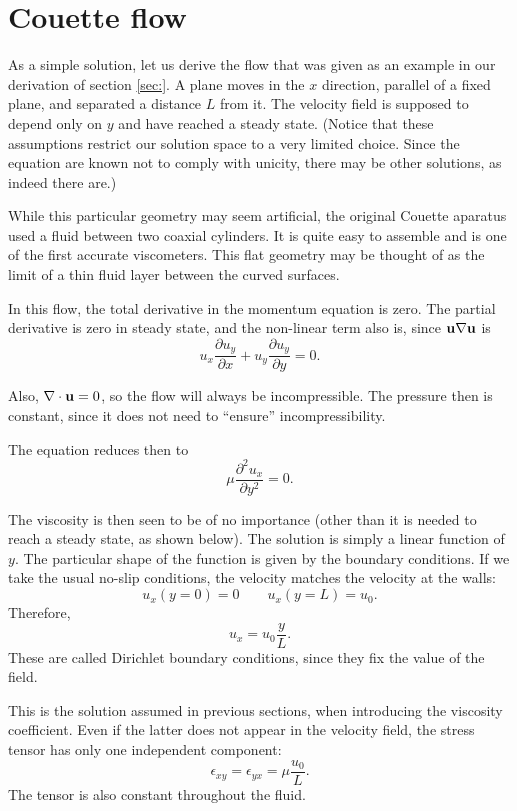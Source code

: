 \section{Couette flow}

As a simple solution, let us derive the flow that was given as an
example in our derivation of section \ref{sec:}. A plane moves in the
$x$ direction, parallel of a fixed plane, and separated a distance $L$
from it. The velocity field is supposed to depend only on $y$ and have
reached a steady state. (Notice that these assumptions restrict our
solution space to a very limited choice. Since the equation are known
not to comply with unicity, there may be other solutions, as indeed
there are.)

While this particular geometry may seem artificial, the original
Couette aparatus used a fluid between two coaxial cylinders. It is
quite easy to assemble and is one of the first accurate
viscometers. This flat geometry may be thought of as the limit of a
thin fluid layer between the curved surfaces.

In this flow, the total derivative in the momentum equation is
zero. The partial derivative is zero in steady state, and the
non-linear term also is, since $\mathbf{u}\nabla \mathbf{u}$ is
\[
u_x \frac{\partial u_y}{\partial x} +
u_y \frac{\partial u_y}{\partial y} = 0 .
\]

Also, $\nabla\cdot\mathbf{u}=0$, so the flow will always be
incompressible. The pressure then is constant, since it does not need
to ``ensure'' incompressibility.

The equation reduces then to
\[
\mu \frac{\partial^2 u_x}{\partial y^2} = 0 .
\]

The viscosity is then seen to be of no importance (other than it is
needed to reach a steady state, as shown below). The solution is
simply a linear function of $y$. The particular shape of the function
is given by the boundary conditions. If we take the usual no-slip
conditions, the velocity matches the velocity at the walls:
\[
u_x(y=0) =  0 \qquad u_x(y=L) = u_0 .
\]
Therefore,
\[
u_x =   u_0 \frac{y}{L} .
\]
These are called Dirichlet boundary conditions, since they fix the
value of the field.

This is the solution assumed in previous sections, when introducing
the viscosity coefficient. Even if the latter does not appear in the
velocity field, the stress tensor has only one independent component:
\[
\epsilon_{xy}=
\epsilon_{yx}=
\mu \frac{u_0}{L} .
\]
The tensor is also constant throughout the fluid.

